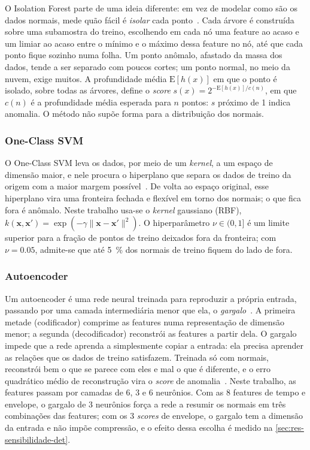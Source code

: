 O Isolation Forest parte de uma ideia diferente: em vez de modelar como são os
dados normais, mede quão fácil é \emph{isolar} cada ponto~\cite{aggarwal2017}.
Cada árvore é construída sobre uma subamostra do treino, escolhendo em cada nó
uma feature ao acaso e um limiar ao acaso entre o mínimo e o máximo dessa
feature no nó, até que cada ponto fique sozinho numa folha. Um ponto anômalo,
afastado da massa dos dados, tende a ser separado com poucos cortes; um ponto
normal, no meio da nuvem, exige muitos. A profundidade média $\mathrm{E}[h(x)]$ em
que o ponto é isolado, sobre todas as árvores, define o \emph{score}
$s(x) = 2^{-\mathrm{E}[h(x)]/c(n)}$, em que $c(n)$ é a profundidade média esperada
para $n$ pontos: $s$ próximo de 1 indica anomalia. O método não supõe forma para
a distribuição dos normais.

\subsubsection{One-Class SVM}

O One-Class SVM leva os dados, por meio de um \emph{kernel}, a um espaço de
dimensão maior, e nele procura o hiperplano que separa os dados de treino da
origem com a maior margem possível~\cite{chandola2009}. De volta ao espaço
original, esse hiperplano vira uma fronteira fechada e flexível em torno dos
normais; o que fica fora é anômalo. Neste trabalho usa-se o \emph{kernel}
gaussiano (RBF),
$k(\mathbf{x}, \mathbf{x}') = \exp(-\gamma \lVert \mathbf{x} - \mathbf{x}' \rVert^2)$.
O hiperparâmetro $\nu \in (0, 1]$ é um limite superior
para a fração de pontos de treino deixados fora da fronteira; com
$\nu = \num{0.05}$, admite-se que até \SI{5}{\percent} dos normais de treino
fiquem do lado de fora.

\subsubsection{Autoencoder}

Um autoencoder é uma rede neural treinada para reproduzir a própria entrada,
passando por uma camada intermediária menor que ela, o
\emph{gargalo}~\cite[cap.~14]{goodfellow2016}. A primeira metade (codificador) comprime as
features numa representação de dimensão menor; a segunda (decodificador)
reconstrói as features a partir dela. O gargalo impede que a rede aprenda a
simplesmente copiar a entrada: ela precisa aprender as relações que os dados de
treino satisfazem. Treinada só com normais, reconstrói bem o que se parece com
eles e mal o que é diferente, e o erro quadrático médio de reconstrução vira o
\emph{score} de anomalia~\cite{chandola2009}. Neste trabalho, as features passam
por camadas de 6, 3 e 6 neurônios. Com as 8 features de tempo e envelope, o
gargalo de 3 neurônios força a rede a resumir os normais em três combinações das
features; com os 3 \emph{scores} de envelope, o gargalo tem a dimensão da entrada e
não impõe compressão, e o efeito dessa escolha é medido na
\autoref{sec:res-sensibilidade-det}.

